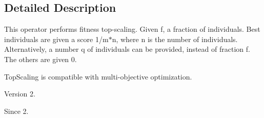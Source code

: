 \subsection{Detailed Description}
This operator performs fitness top-\/scaling. Given f, a fraction of individuals. Best individuals are given a score 1/m$\ast$n, where n is the number of individuals. Alternatively, a number q of individuals can be provided, instead of fraction f. The others are given 0. 

Top\-Scaling is compatible with multi-\/objective optimization.

\begin{DoxyVersion}{Version}
2. 
\end{DoxyVersion}
\begin{DoxySince}{Since}
2. 
\end{DoxySince}


